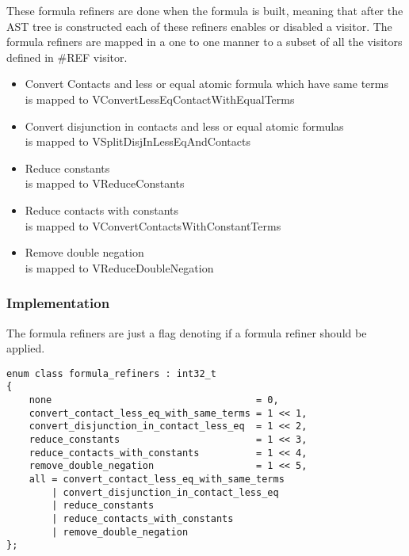 \documentclass{article}
\begin{document}
			These formula refiners are done when the formula is built, meaning that after the 
			AST tree is constructed each of these refiners enables or disabled a visitor. 
			The formula refiners are mapped in a one to one manner to a subset of all the visitors defined 
			in \#REF visitor.

			\begin{itemize}
				\item Convert Contacts and less or equal atomic formula which have same terms \\
					 is mapped to VConvertLessEqContactWithEqualTerms
				\item Convert disjunction in contacts and less or equal atomic formulas \\
					 is mapped to VSplitDisjInLessEqAndContacts
				\item Reduce constants \\
					 is mapped to VReduceConstants
				\item Reduce contacts with constants \\
					 is mapped to VConvertContactsWithConstantTerms
				\item Remove double negation \\
					 is mapped to VReduceDoubleNegation
			\end{itemize}
						
		\subsubsection*{Implementation}
			The formula refiners are just a flag denoting if a formula refiner should be applied.
			\begin{lstlisting}
enum class formula_refiners : int32_t
{
    none                                    = 0,
    convert_contact_less_eq_with_same_terms = 1 << 1,
    convert_disjunction_in_contact_less_eq  = 1 << 2,
    reduce_constants                        = 1 << 3,
    reduce_contacts_with_constants          = 1 << 4,
    remove_double_negation                  = 1 << 5,
    all = convert_contact_less_eq_with_same_terms
        | convert_disjunction_in_contact_less_eq 
        | reduce_constants 
        | reduce_contacts_with_constants 
        | remove_double_negation
};
			\end{lstlisting}

\end{document}
